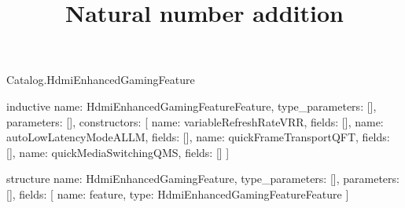\begin{lexlean}{Catalog.HdmiEnhancedGamingFeature}
\title{Natural number addition}
\begin{semanticmodule}
inductive{
  name: HdmiEnhancedGamingFeatureFeature,
  type_parameters: [],
  parameters: [],
  constructors: [
    {name: variableRefreshRateVRR, fields: []},
    {name: autoLowLatencyModeALLM, fields: []},
    {name: quickFrameTransportQFT, fields: []},
    {name: quickMediaSwitchingQMS, fields: []}
  ]
}

structure{
  name: HdmiEnhancedGamingFeature,
  type_parameters: [],
  parameters: [],
  fields: [
    {name: feature, type: HdmiEnhancedGamingFeatureFeature}
  ]
}
\end{semanticmodule}
\end{lexlean}
